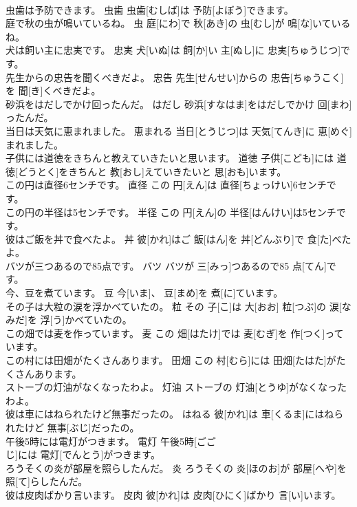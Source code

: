 \documentclass[8pt]{extreport}
\begin{document}
\begin{CJK}{UTF8}{min}
\\	虫歯は予防できます。	虫歯	虫歯[むしば]は 予防[よぼう]できます。	
\\	庭で秋の虫が鳴いているね。	虫	庭[にわ]で 秋[あき]の 虫[むし]が 鳴[な]いているね。	
\\	犬は飼い主に忠実です。	忠実	犬[いぬ]は 飼[か]い 主[ぬし]に 忠実[ちゅうじつ]です。	
\\	先生からの忠告を聞くべきだよ。	忠告	先生[せんせい]からの 忠告[ちゅうこく]を 聞[き]くべきだよ。	
\\	砂浜をはだしでかけ回ったんだ。	はだし	砂浜[すなはま]をはだしでかけ 回[まわ]ったんだ。	
\\	当日は天気に恵まれました。	恵まれる	当日[とうじつ]は 天気[てんき]に 恵[めぐ]まれました。	
\\	子供には道徳をきちんと教えていきたいと思います。	道徳	子供[こども]には 道徳[どうとく]をきちんと 教[おし]えていきたいと 思[おも]います。	
\\	この円は直径6センチです。	直径	この 円[えん]は 直径[ちょっけい]6センチです。	
\\	この円の半径は5センチです。	半径	この 円[えん]の 半径[はんけい]は5センチです。	
\\	彼はご飯を丼で食べたよ。	丼	彼[かれ]はご 飯[はん]を 丼[どんぶり]で 食[た]べたよ。	
\\	バツが三つあるので85点です。	バツ	バツが 三[みっ]つあるので85 点[てん]です。	
\\	今、豆を煮ています。	豆	今[いま]、 豆[まめ]を 煮[に]ています。	
\\	その子は大粒の涙を浮かべていたの。	粒	その 子[こ]は 大[おお] 粒[つぶ]の 涙[なみだ]を 浮[う]かべていたの。	
\\	この畑では麦を作っています。	麦	この 畑[はたけ]では 麦[むぎ]を 作[つく]っています。	
\\	この村には田畑がたくさんあります。	田畑	この 村[むら]には 田畑[たはた]がたくさんあります。	
\\	ストーブの灯油がなくなったわよ。	灯油	ストーブの 灯油[とうゆ]がなくなったわよ。	
\\	彼は車にはねられたけど無事だったの。	はねる	彼[かれ]は 車[くるま]にはねられたけど 無事[ぶじ]だったの。	
\\	午後5時には電灯がつきます。	電灯	午後5時[ごご 
\\	じ]には 電灯[でんとう]がつきます。	
\\	ろうそくの炎が部屋を照らしたんだ。	炎	ろうそくの 炎[ほのお]が 部屋[へや]を 照[て]らしたんだ。	
\\	彼は皮肉ばかり言います。	皮肉	彼[かれ]は 皮肉[ひにく]ばかり 言[い]います。	

\end{CJK}
\end{document}
